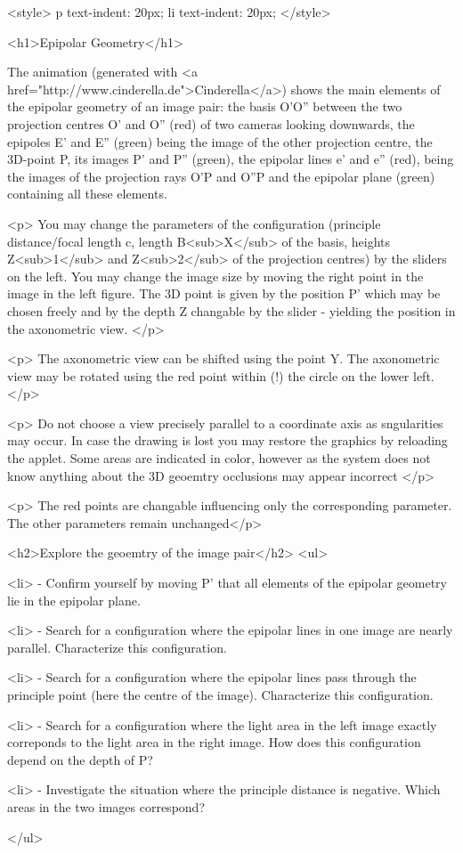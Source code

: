 <style>
p {
  text-indent: 20px;
}
li {
  text-indent: 20px;
}
</style>

<h1>Epipolar Geometry</h1> 
 
The animation (generated with <a
    href="http://www.cinderella.de">Cinderella</a>) 
    shows the main elements of the epipolar geometry of an image pair:
    the basis O'O'' between the two projection centres O' and O'' (red) of two cameras looking downwards, the epipoles E' and E'' (green) being the image of the other projection centre, the 3D-point P, its images P' and P'' (green), the epipolar lines e' and e'' (red), being the images of the projection rays O'P and O''P and the epipolar plane (green) containing all these elements.

    <p> You may change the parameters of the configuration (principle distance/focal length c, length B<sub>X</sub> of the basis, heights  Z<sub>1</sub> and Z<sub>2</sub> of the projection centres) by the sliders on the left. 
    You may change the image size by moving the right point in the image in the left figure. The 3D point is given by the  position P' which may be chosen freely and by the depth Z changable by the slider - yielding the position in the axonometric view.
    </p>

    <p> The axonometric view can be shifted using the point Y. The axonometric view may be rotated using the red point within (!) the circle on the lower left. </p>

    <p> Do not choose a view precisely parallel to a coordinate axis as sngularities may occur. In case the drawing is lost you may restore the graphics by reloading the applet. Some areas are indicated in color, however as the system does not know anything about the 3D geoemtry occlusions may appear incorrect  </p>


    <p> The red points are changable influencing only the corresponding parameter. The other parameters remain unchanged</p>



    <h2>Explore the geoemtry of the image pair</h2>
    <ul>

      <li> - Confirm yourself by moving P' that all elements of the epipolar geometry lie in the epipolar plane.


	<li> - Search for a configuration where the epipolar lines in one image are nearly parallel. Characterize this configuration. 

	  <li> - Search for a configuration where the epipolar lines pass through the principle point (here the centre of the image). Characterize this configuration. 

	    <li>  - Search for a configuration where the light area in the left image exactly correponds to the light area in the right image. How does this configuration depend on the depth of P?

	      <li> - Investigate the situation where the principle distance is negative. Which areas in the two images correspond?

    </ul>